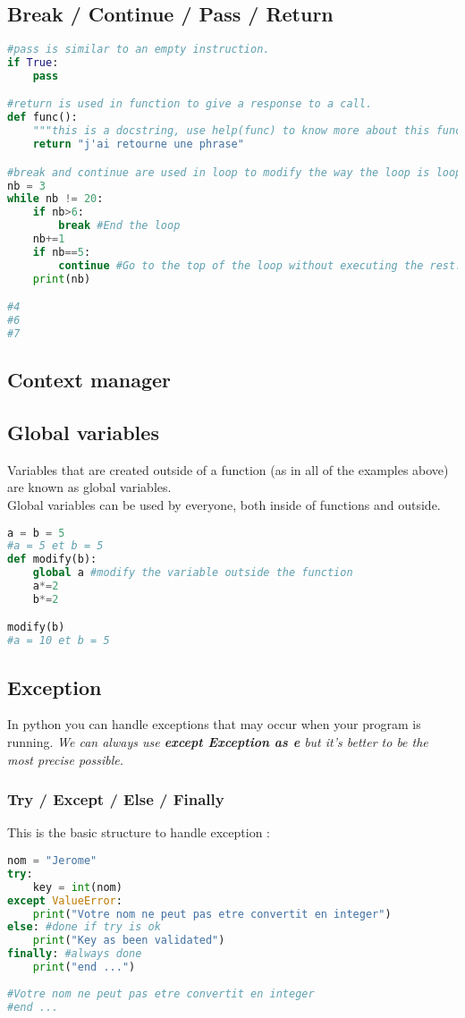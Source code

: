 \documentclass[a4paper, 12pt]{article}
\begin{document}
\subsection{Break / Continue / Pass / Return}
\label{subsec:BCPR}
\begin{lstlisting}[language=Python]
#pass is similar to an empty instruction.
if True:
    pass

#return is used in function to give a response to a call.
def func():
	"""this is a docstring, use help(func) to know more about this function."""
	return "j'ai retourne une phrase"

#break and continue are used in loop to modify the way the loop is looping.
nb = 3
while nb != 20:
	if nb>6:
		break #End the loop
	nb+=1
	if nb==5:
		continue #Go to the top of the loop without executing the rest.	
	print(nb)

#4
#6
#7
\end{lstlisting}

\subsection{Context manager}
\label{subsec:ContextManager}

\subsection{Global variables}
\label{subsec:Global}
Variables that are created outside of a function (as in all of the examples above) are known as global variables.\\
Global variables can be used by everyone, both inside of functions and outside.
\begin{lstlisting}[language=Python]
a = b = 5
#a = 5 et b = 5
def modify(b):
	global a #modify the variable outside the function
	a*=2
	b*=2

modify(b)
#a = 10 et b = 5
\end{lstlisting}

\subsection{Exception}
In python you can handle exceptions that may occur when your program is running. \textit{We can always use \textbf{except Exception as e} but it's better to be the most precise possible.}
\subsubsection{Try / Except / Else / Finally}
This is the basic structure to handle exception :
\label{TEEF}
\begin{lstlisting}[language=Python]
nom = "Jerome"
try:
	key = int(nom)
except ValueError:
	print("Votre nom ne peut pas etre convertit en integer")
else: #done if try is ok
	print("Key as been validated")
finally: #always done
	print("end ...")
	
#Votre nom ne peut pas etre convertit en integer
#end ...
\end{lstlisting}
\end{document}
